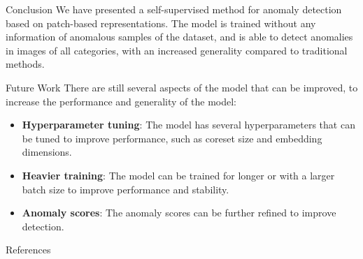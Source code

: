 \documentclass{beamer}
\begin{document}
\begin{frame}{Conclusion}
      We have presented a self-supervised method for anomaly detection based
 on patch-based representations. The model is trained without any information
of anomalous samples of the dataset, and is able to detect 
  anomalies in images of all categories, with an increased 
  generality compared to traditional methods.
\end{frame}
\begin{frame}{Future Work}
      There are still several aspects of the model that can be improved, to 
      increase the performance and generality of the model:
      \begin{itemize}
              \item \textbf{Hyperparameter tuning}: The model has several hyperparameters
               that can be tuned to improve performance, such as coreset size and 
               embedding dimensions.
              \item \textbf{Heavier training}: The model can be trained for longer
               or with a larger batch size to improve performance and stability.
               \item \textbf{Anomaly scores}: The anomaly scores can be further refined
                to improve detection.
                \end{itemize}
\end{frame}

\begin{frame}{References}
\printbibliography
\end{frame}


\backmatter
\end{document}
